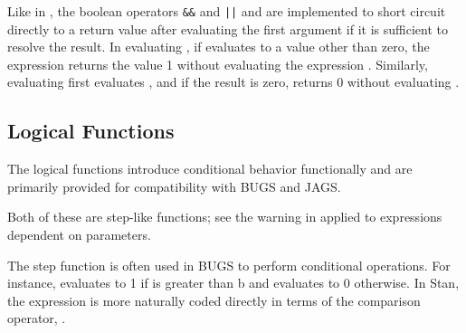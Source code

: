 Like in \Cpp, the boolean operators \Verb/&&/ and \Verb/||/ and are
implemented to short circuit directly to a return value after
evaluating the first argument if it is sufficient to resolve the
result.  In evaluating , if  evaluates to a value
other than zero, the expression returns the value 1 without evaluating
the expression .  Similarly, evaluating  first
evaluates , and if the result is zero, returns 0 without
evaluating .


\subsection{Logical Functions}

The logical functions introduce conditional behavior functionally and
are primarily provided for compatibility with BUGS and JAGS.
%
\begin{description}
\end{description}
%
Both of these are step-like functions; see the warning in
 applied to expressions dependent on
parameters. 

The step function is often used in BUGS to perform conditional
operations.  For instance,  evaluates to 1 if
 is greater than {b} and evaluates to 0 otherwise.  In Stan,
the expression  is more naturally coded directly
in terms of the comparison operator, .  

